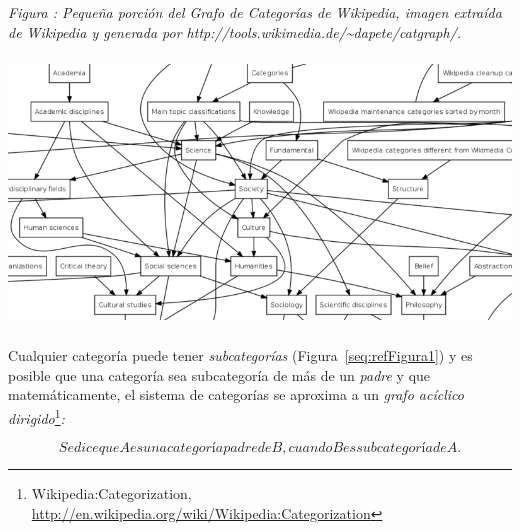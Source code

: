 \documentclass[letterpaper]{article}
\newcounter{Figura}
\renewcommand\theFigura{\arabic{Figura}}
\begin{document}
\begin{center}
\begin{minipage}{14.155cm}
{\centering{}\itshape
Figura {\theFigura\label{seq:refFigura0}}:
Peque\~na porci\'on del Grafo de Categor\'ias de Wikipedia, imagen
extra\'ida de Wikipedia y generada por
http://tools.wikimedia.de/\~{}dapete/catgraph/.
\par}
\includegraphics[width=14.155cm,height=7.183cm]{Capitulo2-img4.png}\end{minipage}
\end{center}
{\sffamily
Cualquier categor\'ia puede tener \textit{subcategor\'ias
}(Figura~\ref{seq:refFigura1})\textit{ }y es posible que una
categor\'ia sea subcategor\'ia de m\'as de un \textit{padre} y que
matem\'aticamente, el sistema de categor\'ias se aproxima a un
\textit{grafo ac\'iclico dirigido}\footnote{Wikipedia:Categorization,
\url{http://en.wikipedia.org/wiki/Wikipedia:Categorization}}\textit{:}}


\bigskip

\begin{equation*}
\mathit{Se}\mathit{dice}\mathit{que}A\mathit{es}\mathit{una}\mathit{categor\text{\'i}a}\mathit{padre}\mathit{de}B,\mathit{cuando}B\mathit{es}\mathit{subcategor\text{\'i}a}\mathit{de}\mathit{A.}
\end{equation*}

\bigskip
\end{document}
